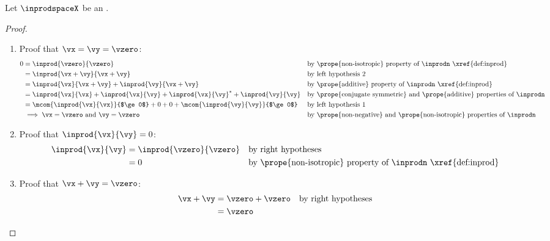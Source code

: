 \begin{theorem}
\label{thm:vsinprod_zero}
Let $\inprodspaceX$ be an .
\end{theorem}
\begin{proof}
\begin{enumerate}
  \item Proof that $\vx=\vy=\vzero$:
    \begin{align*}
      0
        &= \inprod{\vzero}{\vzero}
        && \text{by \prope{non-isotropic} property of $\inprodn$ \xref{def:inprod}}
      \\&= \inprod{\vx+\vy}{\vx+\vy}
        && \text{by left hypothesis 2}
      \\&= \inprod{\vx}{\vx+\vy}+\inprod{\vy}{\vx+\vy}
        && \text{by \prope{additive} property of $\inprodn$ \xref{def:inprod}}
      \\&= \inprod{\vx}{\vx}+\inprod{\vx}{\vy}+\inprod{\vx}{\vy}^\ast+\inprod{\vy}{\vy}
        && \text{by \prope{conjugate symmetric} and \prope{additive} properties of $\inprodn$} %
      \\&= \mcom{\inprod{\vx}{\vx}}{$\ge0$}+0+0+\mcom{\inprod{\vy}{\vy}}{$\ge0$}
        && \text{by left hypothesis 1}
      \\&\implies \vx=\vzero \text{ and } \vy=\vzero
        && \text{by \prope{non-negative} and \prope{non-isotropic} properties of $\inprodn$} %
    \end{align*}

  \item Proof that $\inprod{\vx}{\vy}=0$:
    \begin{align*}
      \inprod{\vx}{\vy}
        &= \inprod{\vzero}{\vzero}
        && \text{by right hypotheses}
      \\&= 0
        && \text{by \prope{non-isotropic} property of $\inprodn$ \xref{def:inprod}}
    \end{align*}

  \item Proof that $\vx + \vy = \vzero$:
    \begin{align*}
      \vx + \vy
        &= \vzero + \vzero
        && \text{by right hypotheses}
      \\&= \vzero
    \end{align*}
\end{enumerate}
\end{proof}

